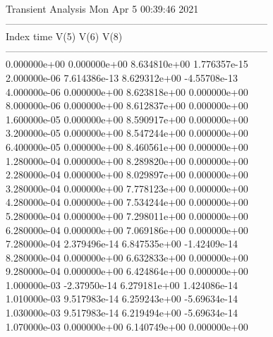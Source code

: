                                    Transient Analysis  Mon Apr  5 00:39:46  2021\\ \hline
--------------------------------------------------------------------------------\\ \hline
Index   time            V(5)            V(6)            V(8)            \\ \hline
--------------------------------------------------------------------------------\\ 	0.000000e+00	0.000000e+00	8.634810e+00	1.776357e-15	\\ 	2.000000e-06	7.614386e-13	8.629312e+00	-4.55708e-13	\\ 	4.000000e-06	0.000000e+00	8.623818e+00	0.000000e+00	\\ 	8.000000e-06	0.000000e+00	8.612837e+00	0.000000e+00	\\ 	1.600000e-05	0.000000e+00	8.590917e+00	0.000000e+00	\\ 	3.200000e-05	0.000000e+00	8.547244e+00	0.000000e+00	\\ 	6.400000e-05	0.000000e+00	8.460561e+00	0.000000e+00	\\ 	1.280000e-04	0.000000e+00	8.289820e+00	0.000000e+00	\\ 	2.280000e-04	0.000000e+00	8.029897e+00	0.000000e+00	\\ 	3.280000e-04	0.000000e+00	7.778123e+00	0.000000e+00	\\ 	4.280000e-04	0.000000e+00	7.534244e+00	0.000000e+00	\\ 	5.280000e-04	0.000000e+00	7.298011e+00	0.000000e+00	\\ 	6.280000e-04	0.000000e+00	7.069186e+00	0.000000e+00	\\ 	7.280000e-04	2.379496e-14	6.847535e+00	-1.42409e-14	\\ 	8.280000e-04	0.000000e+00	6.632833e+00	0.000000e+00	\\ 	9.280000e-04	0.000000e+00	6.424864e+00	0.000000e+00	\\ 	1.000000e-03	-2.37950e-14	6.279181e+00	1.424086e-14	\\ 	1.010000e-03	9.517983e-14	6.259243e+00	-5.69634e-14	\\ 	1.030000e-03	9.517983e-14	6.219494e+00	-5.69634e-14	\\ 	1.070000e-03	0.000000e+00	6.140749e+00	0.000000e+00	\\ \hline
